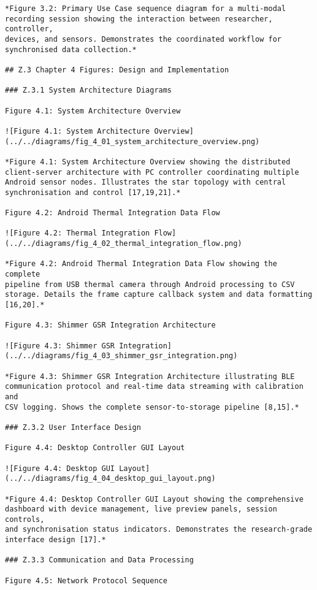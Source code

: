 \begin{verbatim}
*Figure 3.2: Primary Use Case sequence diagram for a multi-modal
recording session showing the interaction between researcher, controller,
devices, and sensors. Demonstrates the coordinated workflow for
synchronised data collection.*

## Z.3 Chapter 4 Figures: Design and Implementation

### Z.3.1 System Architecture Diagrams

Figure 4.1: System Architecture Overview

![Figure 4.1: System Architecture Overview](../../diagrams/fig_4_01_system_architecture_overview.png)

*Figure 4.1: System Architecture Overview showing the distributed
client-server architecture with PC controller coordinating multiple
Android sensor nodes. Illustrates the star topology with central
synchronisation and control [17,19,21].*

Figure 4.2: Android Thermal Integration Data Flow

![Figure 4.2: Thermal Integration Flow](../../diagrams/fig_4_02_thermal_integration_flow.png)

*Figure 4.2: Android Thermal Integration Data Flow showing the complete
pipeline from USB thermal camera through Android processing to CSV
storage. Details the frame capture callback system and data formatting
[16,20].*

Figure 4.3: Shimmer GSR Integration Architecture

![Figure 4.3: Shimmer GSR Integration](../../diagrams/fig_4_03_shimmer_gsr_integration.png)

*Figure 4.3: Shimmer GSR Integration Architecture illustrating BLE
communication protocol and real-time data streaming with calibration and
CSV logging. Shows the complete sensor-to-storage pipeline [8,15].*

### Z.3.2 User Interface Design

Figure 4.4: Desktop Controller GUI Layout

![Figure 4.4: Desktop GUI Layout](../../diagrams/fig_4_04_desktop_gui_layout.png)

*Figure 4.4: Desktop Controller GUI Layout showing the comprehensive
dashboard with device management, live preview panels, session controls,
and synchronisation status indicators. Demonstrates the research-grade
interface design [17].*

### Z.3.3 Communication and Data Processing

Figure 4.5: Network Protocol Sequence


\end{verbatim}

